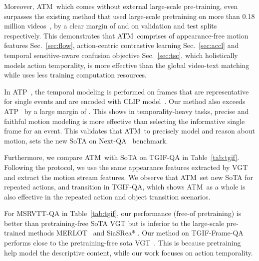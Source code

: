 \documentclass[sigconf]{acmart}
\newcommand{\methodname}{ATM~}
\begin{document}
Moreover, \methodname which comes without external large-scale pre-training, even surpasses the existing method that used large-scale pretraining on more than 0.18 million videos~\cite{bain2021frozen}, by a clear margin of  and  on validation and test splits respectively.  
This demonstrates that \methodname comprises of appearance-free motion features Sec.~\ref{sec:flow}, action-centric contrastive learning Sec.~\ref{sec:accl} and temporal sensitive-aware confusion objective Sec.~\ref{sec:tsc}, which holistically models action temporality, is more effective than the global video-text matching while uses less training computation resources.

In ATP~\cite{buch2022revisiting}, the temporal modeling is performed on frames that are representative for single events and are encoded with CLIP model~\cite{radford2021learning}. Our method also exceeds ATP~\cite{buch2022revisiting} by a large margin of . 
This shows in temporality-heavy tasks, precise and faithful motion modeling is more effective than selecting the informative single frame for an event.
This validates that \methodname to precisely model and reason about motion, sets the new SoTA on Next-QA~\cite{xiao2021next} benchmark.

Furthermore, we compare \methodname with SoTA on TGIF-QA in Table~\ref{tab:tgif}. Following the protocol, we use the same appearance features extracted by VGT~\cite{xiao2022vgt} and extract the motion stream features. 
We observe that \methodname set new SoTA for repeated actions, and transition in TGIF-QA, which shows \methodname as a whole is also effective in the repeated action and object transition scenarios. 

For MSRVTT-QA in Table~\ref{tab:tgif}, our performance (free-of pretraining) is better than pretraining-free SoTA VGT but is inferior to the large-scale pre-trained methods MERLOT~\cite{zellers2021merlot} and SiaSRea* \cite{yu2021learning}. 
Our method on TGIF-Frame-QA performs close to the pretraining-free sota VGT~\cite{xiao2022vgt}.
This is because pretraining help model the descriptive content, while our work focuses on action temporality. 
\end{document}
